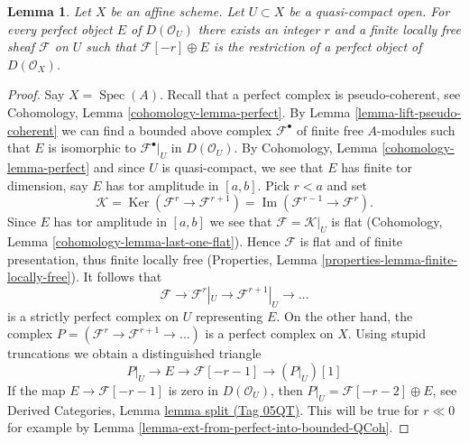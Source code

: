 \documentclass{amsart}
\theoremstyle{plain}
\newtheorem{lemma}[subsection]{Lemma}
\theoremstyle{definition}
\theoremstyle{remark}
\numberwithin{equation}{subsection}
\def\Spec{\mathop{\mathrm{Spec}}}
\def\Ker{\mathop{\mathrm{Ker}}}
\def\Im{\mathop{\mathrm{Im}}}
\begin{document}
\begin{lemma}
\label{lemma-lift-perfect-complex-plus-locally-free}
Let $X$ be an affine scheme. Let $U \subset X$ be a quasi-compact open.
For every perfect object $E$ of $D(\mathcal{O}_U)$ there exists an integer
$r$ and a finite locally free sheaf $\mathcal{F}$ on $U$ such that
$\mathcal{F}[-r] \oplus E$ is the restriction of a perfect object of
$D(\mathcal{O}_X)$.
\end{lemma}

\begin{proof}
Say $X = \Spec(A)$. Recall that a perfect complex is
pseudo-coherent, see
Cohomology, Lemma \ref{cohomology-lemma-perfect}.
By Lemma \ref{lemma-lift-pseudo-coherent} we can find a bounded above complex
$\mathcal{F}^\bullet$ of finite free $A$-modules such that $E$ is
isomorphic to $\mathcal{F}^\bullet|_U$ in $D(\mathcal{O}_U)$.
By Cohomology, Lemma \ref{cohomology-lemma-perfect} and since
$U$ is quasi-compact, we see that $E$ has finite tor dimension, say
$E$ has tor amplitude in $[a, b]$. Pick $r < a$ and set
$$
\mathcal{K} = \Ker(\mathcal{F}^{r} \to \mathcal{F}^{r + 1})
= \Im(\mathcal{F}^{r - 1} \to \mathcal{F}^r).
$$
Since $E$ has tor amplitude in $[a, b]$ we see that
$\mathcal{F} = \mathcal{K}|_U$ is
flat (Cohomology, Lemma \ref{cohomology-lemma-last-one-flat}).
Hence $\mathcal{F}$ is flat and of finite presentation, thus finite
locally free (Properties, Lemma \ref{properties-lemma-finite-locally-free}).
It follows that
$$
\mathcal{F} \to \mathcal{F}^r|_U \to \mathcal{F}^{r + 1}|_U \to \ldots
$$
is a strictly perfect complex on $U$ representing $E$. On the other hand,
the complex $P = (\mathcal{F}^r \to \mathcal{F}^{r + 1} \to \ldots )$
is a perfect complex on $X$. Using
stupid truncations we obtain a distinguished triangle
$$
P|_U \to E \to \mathcal{F}[-r - 1] \to (P|_U)[1]
$$
If the map $E \to \mathcal{F}[-r - 1]$ is zero in $D(\mathcal{O}_U)$,
then $P|_U = \mathcal{F}[-r - 2] \oplus E$, see
Derived Categories, Lemma \href{https://stacks.math.columbia.edu/tag/05QT}{lemma split (Tag 05QT)}.
This will be true for $r \ll 0$ for example by
Lemma \ref{lemma-ext-from-perfect-into-bounded-QCoh}.
\end{proof}
\end{document}
